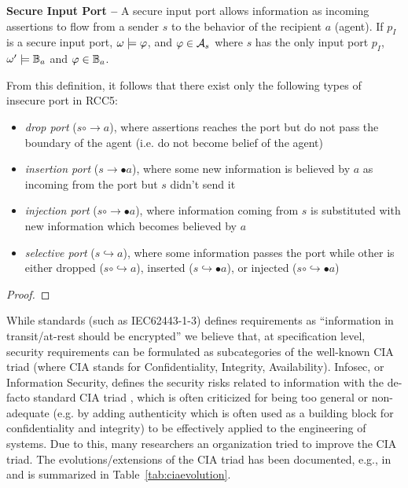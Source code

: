 \begin{definition}{\bf Secure Input Port --}\label{def:secport}
	A secure input port allows information as incoming assertions to flow
	from a sender $s$ to the behavior of the recipient $a$ (agent).  If $p_I$ is a secure input port,
	$\omega\models\varphi$, and $\varphi\in\mathcal{A}_s$ where $s$
	has the only input port $p_I$, $\omega'\models\mathbb{B}_a$ and $\varphi\in\mathbb{B}_a$.
\end{definition}
From this definition, it follows that there exist only the following types of insecure port in RCC5:
\begin{itemize}
	\item \emph{drop port} ($s\circ\rightarrow a$), where assertions reaches the port but do not pass the boundary of the agent (i.e. do not become belief of the agent)
	\item \emph{insertion port} ($s\rightarrow\bullet a$), where some new information is believed by $a$ as incoming from the port but $s$ didn't send it
	\item \emph{injection port} ($s\circ\rightarrow\bullet a$), where information coming from $s$ is substituted with new information which becomes believed by $a$
	\item \emph{selective port} ($s\hookrightarrow a$), where some
		information passes the port while other is either dropped
		($s\circ\hookrightarrow a$), inserted
		($s\hookrightarrow\bullet a$), or injected
		($s\circ\hookrightarrow\bullet a$)
\end{itemize}

\begin{proof}

\end{proof}

While standards (such
as IEC62443-1-3) defines requirements as
``information in transit/at-rest should be encrypted'' we believe that, at
specification level, security requirements can be formulated as subcategories of
the well-known CIA triad (where CIA stands for Confidentiality, Integrity,
Availability).
Infosec, or Information Security, defines the security risks related to
information with the de-facto standard CIA triad , which is often criticized
\autocite{CIAcriticismCPS} for being too general or non-adequate (e.g. by
adding authenticity which is often used as a building block for confidentiality
and integrity) to be effectively applied to the engineering of systems. Due to
this, many researchers an organization tried to improve the CIA triad.  The
evolutions/extensions of the CIA triad has been documented, e.g., in
\autocite{Samonas2014cia} and is summarized in Table~\ref{tab:ciaevolution}.

